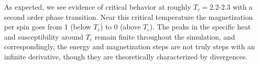 \documentclass[twocolumn,aps,prl]{revtex4-1} %
\begin{document}
As expected, we see evidence of critical behavior at roughly $T_c = 2.2$-$2.3$ with a second order phase transition. Near this critical temperature the magnetization per spin goes from 1 (below $T_c$) to 0 (above $T_c$). The peaks in the specific heat and susceptibility around $T_c$ remain finite throughout the simulation, and correspondingly, the energy and magnetization steps are not truly steps with an infinite derivative, though they are theoretically characterized by divergences. 

%
\end{document}
